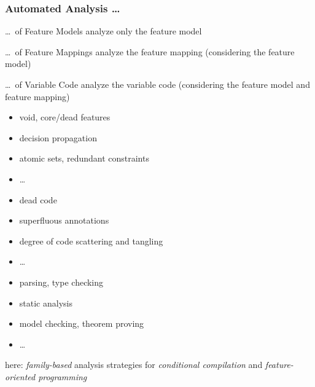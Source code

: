 \subsubsection*{Automated Analysis \ldots}

\begin{frame}{\myframetitle}
	\begin{fancycolumns}[t,columns=3]
		\textbf{\lecturemodeling\partc}
		\begin{definition}{\ldots\ of Feature Models}
			analyze only the feature model
		\end{definition}
	\nextcolumn{}
		\textbf{\lectureanalyses\partb}
		\begin{definition}{\ldots\ of Feature Mappings}
			analyze the feature mapping (considering the feature model)
		\end{definition}
	\nextcolumn{}
		\textbf{\lectureanalyses\partc}
		\begin{definition}{\ldots\ of Variable Code}
			analyze the variable code (considering the feature model and feature mapping)
		\end{definition}
	\end{fancycolumns}
	\begin{fancycolumns}[t,columns=3]
		\begin{example}{}
			\begin{itemize}
				\item void, core/dead features
				\item decision propagation
				\item atomic sets, redundant constraints
				\item \ldots
			\end{itemize}
		\end{example}
	\nextcolumn{}
		\begin{example}{}
			\begin{itemize}
				\item dead code
				\item superfluous annotations
				\item degree of code scattering and tangling
				\item \ldots
			\end{itemize}
		\end{example}
	\nextcolumn{}
		\begin{example}{}
			\begin{itemize}
				\item parsing, type checking
				\item static analysis
				\item model checking, theorem proving
				\item \ldots
			\end{itemize}
		\end{example}
	\end{fancycolumns}
	\begin{fancycolumns}[t,columns=2,widths={32}]
	\nextcolumn{}
		\begin{note}{}
			here: \emph{family-based} analysis strategies for \emph{conditional compilation} and \emph{feature-oriented programming}
		\end{note}
	\end{fancycolumns}
\end{frame}